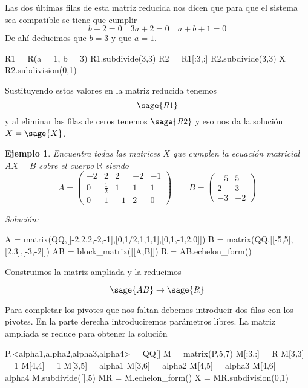 \documentclass{amsart}
\newtheorem{ejem}{Ejemplo}
\def\r{\mathbb{R}}
\begin{document}
Las dos últimas filas de esta matriz reducida nos dicen que para que
el sistema sea compatible se tiene que cumplir
\[ b+2 = 0 \quad 3a+2 = 0 \quad a+b+1 = 0 \]
De ahí deducimos que $b = 3$ y que $a = 1$. 

\begin{sageblock}
R1 = R(a = 1, b = 3)
R1.subdivide(3,3)
R2 = R1[:3,:]
R2.subdivide(3,3)
X = R2.subdivision(0,1)
\end{sageblock}

Sustituyendo estos valores en la matriz reducida tenemos 
\[ \sage{R1} \]
y al eliminar las filas de ceros tenemos
$\sage{R2}$
y eso nos da la solución $X = \sage{X}$.


\begin{ejem}
Encuentra todas las matrices $X$ que cumplen la ecuación matricial $AX = B$
sobre el cuerpo $\r$ siendo 
\[ 
A = \left(\begin{array}{rrrrr}
-2 & 2 & 2 & -2 & -1 \\
0 & \frac{1}{2} & 1 & 1 & 1 \\
0 & 1 & -1 & 2 & 0
\end{array}\right) 
\qquad 
B = \left(\begin{array}{rr}
-5 & 5 \\
2 & 3 \\
-3 & -2
\end{array}\right)
\]
\end{ejem}
{\it Solución:}


\begin{sageblock}
A = matrix(QQ,[[-2,2,2,-2,-1],[0,1/2,1,1,1],[0,1,-1,2,0]])
B = matrix(QQ,[[-5,5],[2,3],[-3,-2]])
AB = block_matrix([[A,B]])
R = AB.echelon_form()
\end{sageblock}

Construimos la matriz ampliada y la reducimos

\[ \sage{AB} \to \sage{R} \]

Para completar los pivotes que nos faltan debemos introducir dos
filas con los pivotes. En la parte derecha introduciremos parámetros
libres. La matriz ampliada se reduce para obtener la solución

\begin{sageblock}
P.<alpha1,alpha2,alpha3,alpha4> = QQ[]
M = matrix(P,5,7)
M[:3,:] = R
M[3,3] = 1
M[4,4] = 1
M[3,5] = alpha1
M[3,6] = alpha2
M[4,5] = alpha3
M[4,6] = alpha4
M.subdivide([],5)
MR = M.echelon_form()
X = MR.subdivision(0,1)
\end{sageblock}
\end{document}
